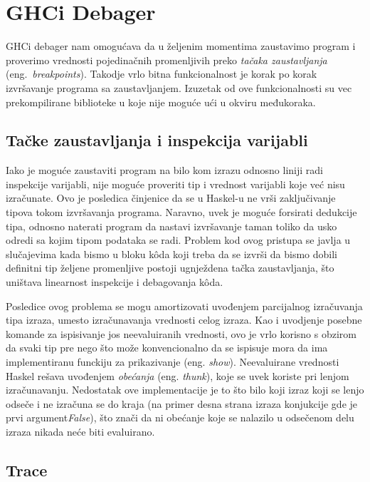 \documentclass[a4paper]{article}
\begin{document}
{{\section{GHCi Debager}
GHCi debager nam omogućava da u željenim momentima zaustavimo program i proverimo vrednosti pojedinačnih promenljivih preko {\em tačaka zaustavljanja} (eng.~{\em breakpoints}). Takodje vrlo bitna funkcionalnost je korak po korak izvršavanje programa sa zaustavljanjem. Izuzetak od ove funkcionalnosti su vec prekompilirane biblioteke u koje nije moguće ući u okviru međukoraka.


\subsection{Tačke zaustavljanja i inspekcija varijabli}
Iako je moguće zaustaviti program na bilo kom izrazu odnosno liniji radi inspekcije varijabli, nije moguće proveriti tip i vrednost varijabli koje već nisu izračunate. Ovo je posledica činjenice da se u Haskel-u ne vrši zaključivanje tipova tokom izvršavanja programa. Naravno, uvek je moguće forsirati dedukcije tipa, odnosno naterati program da nastavi izvršavanje taman toliko da usko odredi sa kojim tipom podataka se radi. Problem kod ovog pristupa se javlja u slučajevima kada bismo u bloku k\^{o}da koji treba da se izvrši da bismo dobili definitni tip željene promenljive postoji ugnježdena tačka zaustavljanja, što uništava linearnost inspekcije i debagovanja k\^{o}da. 

Posledice ovog problema se mogu amortizovati uvođenjem parcijalnog izračuvanja tipa izraza, umesto izračunavanja vrednosti celog izraza. Kao i uvodjenje posebne komande za ispisivanje jos neevaluiranih vrednosti, ovo je vrlo korisno s obzirom da svaki tip pre nego što može konvencionalno da se ispisuje mora da ima implementiranu funckiju za prikazivanje (eng. {\em show}). Neevaluirane vrednosti Haskel rešava uvođenjem {\em obećanja} (eng. {\em thunk}), koje se uvek koriste pri lenjom izračunavanju. Nedostatak ove implementacije je to što bilo koji izraz koji se lenjo odseče i ne izračuna se do kraja (na primer desna strana izraza konjukcije gde je prvi argument{\em False}), što znači da ni obećanje koje se nalazilo u odsečenom delu izraza nikada neće biti evaluirano.\cite{lipovaca2011learn} 


\subsection{Trace}

}}
\end{document}
